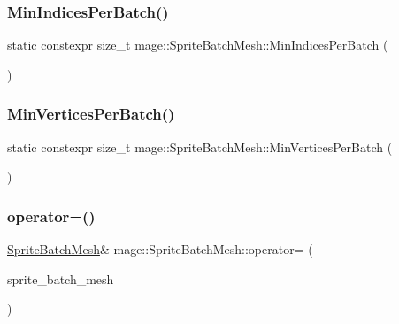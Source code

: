 \hypertarget{classmage_1_1_sprite_batch_mesh_aca5b4cf24139e77ef1fcf54196d8e3ca}{}\label{classmage_1_1_sprite_batch_mesh_aca5b4cf24139e77ef1fcf54196d8e3ca} 
\subsubsection{\texorpdfstring{Min\+Indices\+Per\+Batch()}{MinIndicesPerBatch()}}
{\footnotesize\ttfamily static constexpr size\+\_\+t mage\+::\+Sprite\+Batch\+Mesh\+::\+Min\+Indices\+Per\+Batch (\begin{DoxyParamCaption}{ }\end{DoxyParamCaption})\hspace{0.3cm}{\ttfamily [static]}}

\hypertarget{classmage_1_1_sprite_batch_mesh_a950ee2612c64733397fec4d03f12a531}{}\label{classmage_1_1_sprite_batch_mesh_a950ee2612c64733397fec4d03f12a531} 
\subsubsection{\texorpdfstring{Min\+Vertices\+Per\+Batch()}{MinVerticesPerBatch()}}
{\footnotesize\ttfamily static constexpr size\+\_\+t mage\+::\+Sprite\+Batch\+Mesh\+::\+Min\+Vertices\+Per\+Batch (\begin{DoxyParamCaption}{ }\end{DoxyParamCaption})\hspace{0.3cm}{\ttfamily [static]}}

\hypertarget{classmage_1_1_sprite_batch_mesh_ac6b9c2c79286f736d9a91a79cfa70044}{}\label{classmage_1_1_sprite_batch_mesh_ac6b9c2c79286f736d9a91a79cfa70044} 
\subsubsection{\texorpdfstring{operator=()}{operator=()}\hspace{0.1cm}{\footnotesize\ttfamily [1/2]}}
{\footnotesize\ttfamily \hyperlink{classmage_1_1_sprite_batch_mesh}{Sprite\+Batch\+Mesh}\& mage\+::\+Sprite\+Batch\+Mesh\+::operator= (\begin{DoxyParamCaption}\item[{const \hyperlink{classmage_1_1_sprite_batch_mesh}{Sprite\+Batch\+Mesh} \&}]{sprite\+\_\+batch\+\_\+mesh }\end{DoxyParamCaption})\hspace{0.3cm}{\ttfamily [delete]}}

